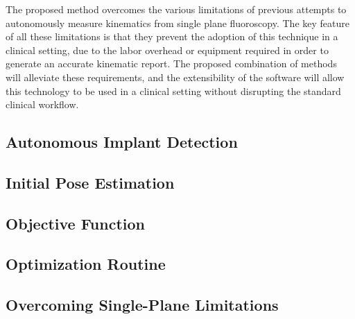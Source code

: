 The proposed method overcomes the various limitations of previous attempts to autonomously measure kinematics from single plane fluoroscopy. The key feature of all these limitations is that they prevent the adoption of this technique in a clinical setting, due to the labor overhead or equipment required in order to generate an accurate kinematic report. The proposed combination of methods will alleviate these requirements, and the extensibility of the software will allow this technology to be used in a clinical setting without disrupting the standard clinical workflow.

\subsection{Autonomous Implant Detection}
\label{sec:implant-detection}


\subsection{Initial Pose Estimation}
\label{sec:pose-estimation}


\subsection{Objective Function}
\label{sec:objective-function}


\subsection{Optimization Routine}
\label{sec:optimization-routine}



\subsection{Overcoming Single-Plane Limitations}
\label{sec:single-plane-limitations}
